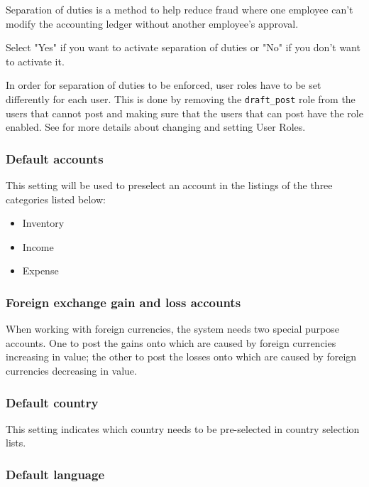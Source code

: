 Separation of duties  is a method to help reduce fraud where one employee can't modify the
accounting ledger without another employee's approval.

Select "Yes" if you want to activate separation of duties or "No" if you don't
want to activate it.

In order for separation of duties to be enforced, user roles have to be set differently for each user. This is done by removing the \texttt{draft\_post} role from the users that cannot post and making sure that the users that can post have the role enabled.  See  for more details about changing and setting User Roles.

\subsubsection{Default accounts}
\label{subsubsec-company-config-defaults-accounts}

This setting will be used to preselect an account in
the listings of the three categories listed below:
\begin{itemize}
\item Inventory
\item Income
\item Expense
\end{itemize}


\subsubsection{Foreign exchange gain and loss accounts}
\label{subsubsec-company-config-defaults-fx-accounts}

When working with foreign currencies,
the system needs two special purpose accounts. One to post the gains onto which are
caused by foreign currencies increasing in value; the other to post the losses onto
which are caused by foreign currencies decreasing in value.


\subsubsection{Default country}
\label{subsubsec-company-config-defaults-country}

This setting indicates which country needs to be pre-selected
   in country selection lists.


\subsubsection{Default language}
\label{subsubsec-company-config-defaults-language}

